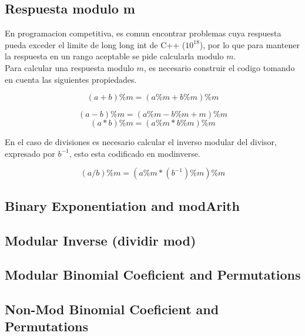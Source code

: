 \subsection{Respuesta modulo m}
\begin{justify}
En programacion competitiva, es comun encontrar problemas cuya respuesta pueda exceder el limite de long long int de C++ ($10^{18}$), por lo que para mantener la respuesta en un rango aceptable se pide calcularla modulo $m$.
\\
Para calcular una respuesta modulo $m$, es necesario construir el codigo tomando en cuenta las siguientes propiedades.
\end{justify}
\begin{equation*}
    (a+b)\%m = (a\%m + b\%m)\%m
\end{equation*}

\begin{equation*}
    (a-b)\%m = (a\%m - b\%m + m)\%m
\end{equation*}
\begin{equation*}
    (a*b)\%m = (a\%m * b\%m)\%m
\end{equation*}
\begin{justify}
En el caso de divisiones es necesario calcular el inverso modular del divisor, expresado por $b^{-1}$, esto esta codificado en modinverse.
\end{justify}
\begin{equation*}
    (a/b)\%m = (a\%m * (b^{-1})\%m)\%m
\end{equation*}

\subsection{Binary Exponentiation and modArith}
\subsection{Modular Inverse (dividir mod)}
\subsection{Modular Binomial Coeficient and Permutations}
\subsection{Non-Mod Binomial Coeficient and Permutations}
